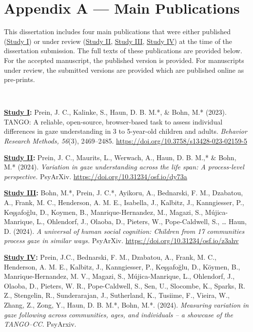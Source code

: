 \documentclass[
]{scrbook}
\begin{document}
\chapter{Appendix A --- Main Publications}\label{appendixA}

This dissertation includes four main publications that were either published (\hyperref[studyI]{Study I}) or under review (\hyperref[studyII]{Study II}, \hyperref[studyIII]{Study III}, \hyperref[studyIV]{Study IV}) at the time of the dissertation submission. The full texts of these publications are provided below. For the accepted manuscript, the published version is provided. For manuscripts under review, the submitted versions are provided which are published online as pre-prints.

~

\textbf{\hyperref[studyI]{Study I}:} Prein, J. C., Kalinke, S., Haun, D. B. M.*, \& Bohn, M.* (2023). TANGO: A reliable, open-source, browser-based task to assess individual differences in gaze understanding in 3 to 5-year-old children and adults. \emph{Behavior Research Methods, 56}(3), 2469--2485. \url{https://doi.org/10.3758/s13428-023-02159-5}

\textbf{\hyperref[studyII]{Study II}:} Prein, J. C., Maurits, L., Werwach, A., Haun, D. B. M.,* \& Bohn, M.* (2024). \emph{Variation in gaze understanding across the life span: A process-level perspective.} PsyArXiv. \url{https://doi.org/10.31234/osf.io/dy73a}

\textbf{\hyperref[studyIII]{Study III}:} Bohn, M.*, Prein, J. C.*, Ayikoru, A., Bednarski, F. M., Dzabatou, A., Frank, M. C., Henderson, A. M. E., Isabella, J., Kalbitz, J., Kanngiesser, P., Keşşafoğlu, D., Koymen, B., Manrique-Hernandez, M., Magazi, S., Mújica-Manrique, L., Ohlendorf, J., Olaoba, D., Pieters, W., Pope-Caldwell, S., \ldots{} Haun, D. (2024). \emph{A universal of human social cognition: Children from 17 communities process gaze in similar ways.} PsyArXiv. \url{https://doi.org/10.31234/osf.io/z3ahv}

\textbf{\hyperref[studyIV]{Study IV}:} Prein, J.C., Bednarski, F. M., Dzabatou, A., Frank, M. C., Henderson, A. M. E., Kalbitz, J., Kanngiesser, P., Keşşafoğlu, D., Köymen, B., Manrique-Hernandez, M. V., Magazi, S., Mújica-Manrique, L., Ohlendorf, J., Olaoba, D., Pieters, W. R., Pope-Caldwell, S., Sen, U., Slocombe, K., Sparks, R. Z., Stengelin, R., Sunderarajan, J., Sutherland, K., Tusiime, F., Vieira, W., Zhang, Z., Zong, Y., Haun, D. B. M.*, Bohn, M.*. (2024). \emph{Measuring variation in gaze following across communities, ages, and individuals -- a showcase of the TANGO--CC.} PsyArxiv.
\end{document}
